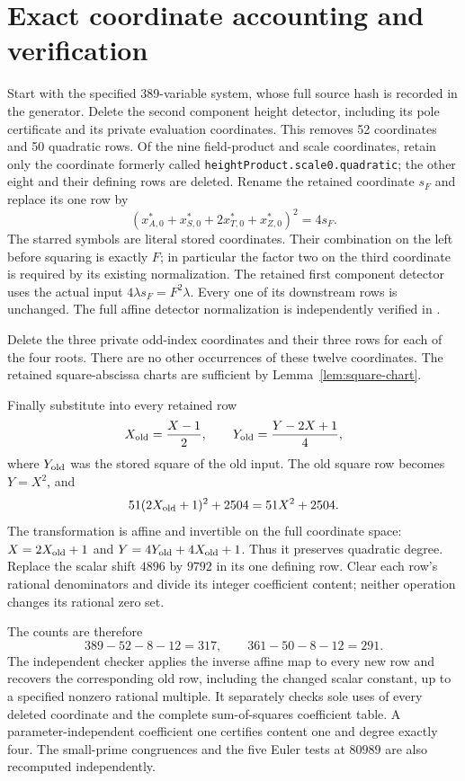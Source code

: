 \documentclass[11pt,a4paper]{article}
\theoremstyle{remark}\newtheorem{remark}[theorem]{Remark}
\begin{document}
\section{Exact coordinate accounting and verification}
Start with the specified 389-variable system, whose full source
hash is recorded in the generator. Delete the second component
height detector, including its pole certificate and its private
evaluation coordinates. This removes 52 coordinates and 50
quadratic rows. Of the nine field-product and scale coordinates,
retain only the coordinate formerly called
\nolinkurl{heightProduct.scale0.quadratic}; the other eight and
their defining rows are deleted. Rename the retained coordinate
$s_F$ and replace its one row by
\[
 (x_{A,0}^*+x_{S,0}^*+2x_{T,0}^*+x_{Z,0}^*)^2=4s_F.
\]
The starred symbols are literal stored coordinates. Their
combination on the left before squaring is exactly $F$; in
particular the factor two on the third coordinate is required
by its existing normalization. The retained first component
detector uses the actual input $4\lambda s_F=F^2\lambda$.
Every one of its downstream rows is unchanged. The full affine
detector normalization is independently verified in
\cite{Quartic389}.

Delete the three private odd-index coordinates and their three
rows for each of the four roots. There are no other occurrences
of these twelve coordinates. The retained square-abscissa charts
are sufficient by Lemma~\ref{lem:square-chart}.

Finally substitute into every retained row
\[
 X_{\rm old}=\frac{X-1}{2},\qquad
 Y_{\rm old}=\frac{Y-2X+1}{4},
\]
where $Y_{\rm old}$ was the stored square of the old input.
The old square row becomes $Y=X^2$, and
\[
 51(2X_{\rm old}+1)^2+2504=51X^2+2504.
\]
The transformation is affine and invertible on the full coordinate
space: $X=2X_{\rm old}+1$ and
$Y=4Y_{\rm old}+4X_{\rm old}+1$. Thus it preserves quadratic
degree. Replace the scalar shift $4896$ by $9792$ in its one
defining row. Clear each row's rational denominators and divide
its integer coefficient content; neither operation changes its
rational zero set.

The counts are therefore
\[
 389-52-8-12=317,\qquad361-50-8-12=291.
\]
The independent checker applies the inverse affine map to every
new row and recovers the corresponding old row, including the
changed scalar constant, up to a specified nonzero rational
multiple. It separately checks sole uses of every deleted
coordinate and the complete sum-of-squares coefficient table.
A parameter-independent coefficient one certifies content one
and degree exactly four. The small-prime congruences and the
five Euler tests at $80989$ are also recomputed independently.
\end{document}
